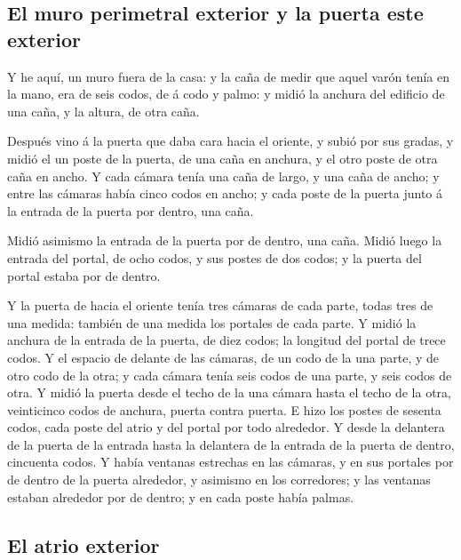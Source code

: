 \hypertarget{el-muro-perimetral-exterior-y-la-puerta-este-exterior}{%
\subsection{El muro perimetral exterior y la puerta este
exterior}\label{el-muro-perimetral-exterior-y-la-puerta-este-exterior}}

 Y he aquí, un muro fuera de la casa: y la caña de medir
que aquel varón tenía en la mano, era de seis codos, de á codo y palmo:
y midió la anchura del edificio de una caña, y la altura, de otra caña.

 Después vino á la puerta que daba cara hacia el oriente,
y subió por sus gradas, y midió el un poste de la puerta, de una caña en
anchura, y el otro poste de otra caña en ancho.  Y cada
cámara tenía una caña de largo, y una caña de ancho; y entre las cámaras
había cinco codos en ancho; y cada poste de la puerta junto á la entrada
de la puerta por dentro, una caña.

 Midió asimismo la entrada de la puerta por de dentro, una
caña.  Midió luego la entrada del portal, de ocho codos, y
sus postes de dos codos; y la puerta del portal estaba por de dentro.

 Y la puerta de hacia el oriente tenía tres cámaras de
cada parte, todas tres de una medida: también de una medida los portales
de cada parte.  Y midió la anchura de la entrada de la
puerta, de diez codos; la longitud del portal de trece codos.
 Y el espacio de delante de las cámaras, de un codo de la
una parte, y de otro codo de la otra; y cada cámara tenía seis codos de
una parte, y seis codos de otra.  Y midió la puerta desde
el techo de la una cámara hasta el techo de la otra, veinticinco codos
de anchura, puerta contra puerta.  E hizo los postes de
sesenta codos, cada poste del atrio y del portal por todo alrededor.
 Y desde la delantera de la puerta de la entrada hasta la
delantera de la entrada de la puerta de dentro, cincuenta codos.
 Y había ventanas estrechas en las cámaras, y en sus
portales por de dentro de la puerta alrededor, y asimismo en los
corredores; y las ventanas estaban alrededor por de dentro; y en cada
poste había palmas.

\hypertarget{el-atrio-exterior}{%
\subsection{El atrio exterior}\label{el-atrio-exterior}}

